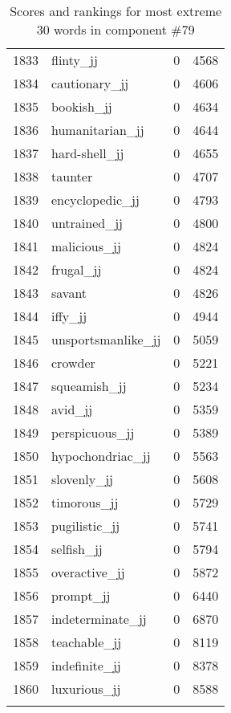 \begin{longtable}[!htbp]{| rlr@{.}l |}
    1833 & flinty\_jj & 0 & 4568 \\
    1834 & cautionary\_jj & 0 & 4606 \\
    1835 & bookish\_jj & 0 & 4634 \\
    1836 & humanitarian\_jj & 0 & 4644 \\
    1837 & hard-shell\_jj & 0 & 4655 \\
    1838 & taunter & 0 & 4707 \\
    1839 & encyclopedic\_jj & 0 & 4793 \\
    1840 & untrained\_jj & 0 & 4800 \\
    1841 & malicious\_jj & 0 & 4824 \\
    1842 & frugal\_jj & 0 & 4824 \\
    1843 & savant & 0 & 4826 \\
    1844 & iffy\_jj & 0 & 4944 \\
    1845 & unsportsmanlike\_jj & 0 & 5059 \\
    1846 & crowder & 0 & 5221 \\
    1847 & squeamish\_jj & 0 & 5234 \\
    1848 & avid\_jj & 0 & 5359 \\
    1849 & perspicuous\_jj & 0 & 5389 \\
    1850 & hypochondriac\_jj & 0 & 5563 \\
    1851 & slovenly\_jj & 0 & 5608 \\
    1852 & timorous\_jj & 0 & 5729 \\
    1853 & pugilistic\_jj & 0 & 5741 \\
    1854 & selfish\_jj & 0 & 5794 \\
    1855 & overactive\_jj & 0 & 5872 \\
    1856 & prompt\_jj & 0 & 6440 \\
    1857 & indeterminate\_jj & 0 & 6870 \\
    1858 & teachable\_jj & 0 & 8119 \\
    1859 & indefinite\_jj & 0 & 8378 \\
    1860 & luxurious\_jj & 0 & 8588 \\
    \hline
    \caption{Scores and rankings for most extreme 30 words in component \#79} \\
\end{longtable}
